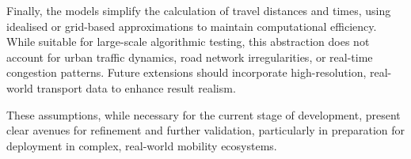 Finally, the models simplify the calculation of travel distances and times, using idealised or grid-based approximations to maintain computational efficiency. While suitable for large-scale algorithmic testing, this abstraction does not account for urban traffic dynamics, road network irregularities, or real-time congestion patterns. Future extensions should incorporate high-resolution, real-world transport data to enhance result realism.

These assumptions, while necessary for the current stage of development, present clear avenues for refinement and further validation, particularly in preparation for deployment in complex, real-world mobility ecosystems.

